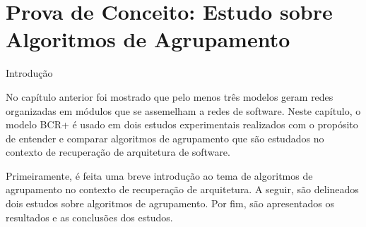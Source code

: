 
\chapter{Prova de Conceito: Estudo sobre Algoritmos de Agrupamento} \label{cap:estudo}


\begin{section}{Introdução}

No capítulo anterior foi mostrado que pelo menos três modelos geram redes organizadas em módulos que se assemelham a redes de software. Neste capítulo, o modelo BCR+ é usado em dois estudos experimentais realizados com o propósito de entender e comparar algoritmos de agrupamento que são estudados no contexto de recuperação de arquitetura de software. 

Primeiramente, é feita uma breve introdução ao tema de algoritmos de agrupamento no contexto de recuperação de arquitetura. A seguir, são delineados dois estudos sobre algoritmos de agrupamento. Por fim, são apresentados os resultados e as conclusões dos estudos.

\end{section}

